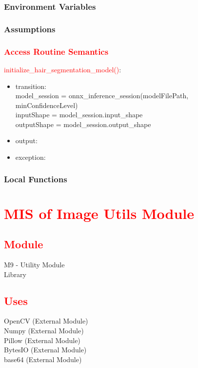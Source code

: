 \documentclass[12pt, titlepage]{article}
\begin{document}
\subsubsection{Environment Variables}

\subsubsection{Assumptions}

\subsubsection{\textcolor{red}{Access Routine Semantics}}
\color{red}
\noindent \textcolor{red}{initialize\_hair\_segmentation\_model()}:
\begin{itemize}
\item transition: \\
model\_session = onnx\_inference\_session(modelFilePath, minConfidenceLevel) \\ 
inputShape = model\_session.input\_shape \\ 
outputShape = model\_session.output\_shape \\ 
\item output: 
\item exception:
\end{itemize}
\color{black}

\subsubsection{Local Functions}

\newpage
\section{\textcolor{red}{MIS of Image Utils Module}}
\subsection{\textcolor{red}{Module}}
M9 - Utility Module\\
Library


\subsection{\textcolor{red}{Uses}}
OpenCV (External Module) \\
Numpy (External Module) \\
\color{red}
Pillow (External Module) \\ 
BytesIO (External Module) \\
base64 (External Module)
\color{black}
\end{document}
